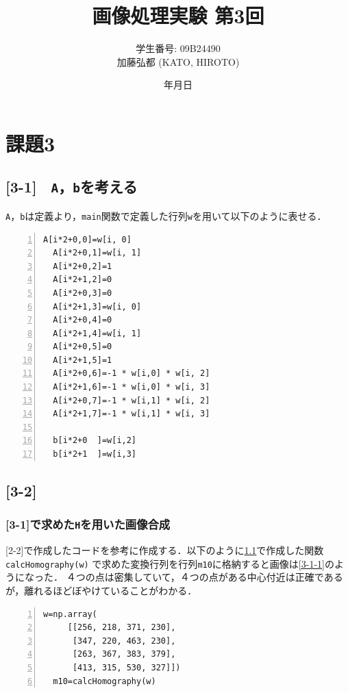 \documentclass[autodetect-engine,dvi=dvipdfmx,ja=standard,
               a4j,11pt]{bxjsarticle}
\title{画像処理実験 第3回}
\author{学生番号: 09B24490\\
        加藤弘都 (KATO, HIROTO)}
\date{\number\year 年\number\month 月\number\day 日}
\begin{document}
\maketitle

\section{課題3} \label{sec:abstract}

\subsection{[3-1]　\texttt{A}，\texttt{b}を考える} \label{3-1}

\verb|A|，\verb|b|は定義より，\verb|main|関数で定義した行列\verb|w|を用いて以下のように表せる．


\begin{Verbatim}[numbers=left, xleftmargin=10mm, numbersep=6pt,
                    fontsize=\small, baselinestretch=0.8]
  A[i*2+0,0]=w[i, 0]
  A[i*2+0,1]=w[i, 1] 
  A[i*2+0,2]=1
  A[i*2+1,2]=0
  A[i*2+0,3]=0
  A[i*2+1,3]=w[i, 0] 
  A[i*2+0,4]=0
  A[i*2+1,4]=w[i, 1]
  A[i*2+0,5]=0
  A[i*2+1,5]=1
  A[i*2+0,6]=-1 * w[i,0] * w[i, 2]
  A[i*2+1,6]=-1 * w[i,0] * w[i, 3]
  A[i*2+0,7]=-1 * w[i,1] * w[i, 2]
  A[i*2+1,7]=-1 * w[i,1] * w[i, 3]

  b[i*2+0  ]=w[i,2]
  b[i*2+1  ]=w[i,3]
\end{Verbatim}


\subsection{[3-2]}

\subsubsection{[3-1]で求めた\texttt{H}を用いた画像合成}

[2-2]で作成したコードを参考に作成する．以下のように\ref{3-1}で作成した関数\verb|calcHomography(w)|
で求めた変換行列を行列\verb|m10|に格納すると画像は\ref{3-1-1}のようになった．
４つの点は密集していて，４つの点がある中心付近は正確であるが，離れるほどぼやけていることがわかる．

\begin{Verbatim}[numbers=left, xleftmargin=10mm, numbersep=6pt,
                    fontsize=\small, baselinestretch=0.8]
  w=np.array(
     [[256, 218, 371, 230],
      [347, 220, 463, 230],
      [263, 367, 383, 379],
      [413, 315, 530, 327]])
  m10=calcHomography(w)
\end{Verbatim}
\end{document}
